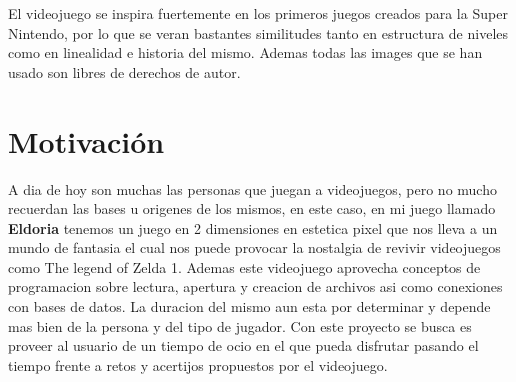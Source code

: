 \documentclass[a4paper]{article}
\begin{document}
    El videojuego se inspira fuertemente en los primeros juegos creados para la Super Nintendo, por lo que se veran bastantes similitudes tanto en estructura de niveles
    como en linealidad e historia del mismo. Ademas todas las images que se han usado son libres de derechos de autor.

    \clearpage
    \section{Motivación}
    A dia de hoy son muchas las personas que juegan a videojuegos, pero no mucho recuerdan las bases u origenes de los mismos, en este caso, en mi juego llamado
    \textbf{Eldoria} tenemos un juego en 2 dimensiones en estetica pixel que nos lleva a un mundo de fantasia el cual nos puede provocar la nostalgia de revivir
    videojuegos como The legend of Zelda 1. Ademas este videojuego aprovecha conceptos de programacion sobre lectura, apertura y creacion de archivos asi como 
    conexiones con bases de datos. La duracion del mismo aun esta por determinar y depende mas bien de la persona y del tipo de jugador. Con este proyecto se busca
    es proveer al usuario de un tiempo de ocio en el que pueda disfrutar pasando el tiempo frente a retos y acertijos propuestos por el videojuego.
    \clearpage
\end{document}
